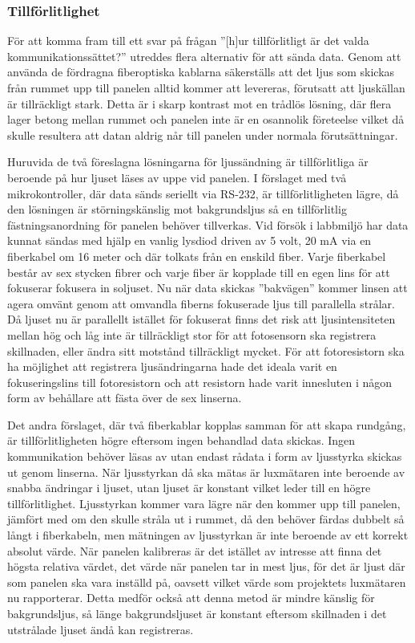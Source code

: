 
        \subsubsection{Tillförlitlighet} %
        \label{sub:tillf_rlitlighet}
            För att komma fram till ett svar på frågan ''[h]ur tillförlitligt är det valda kommunikationssättet?'' utreddes flera alternativ för att sända data. Genom att använda de fördragna fiberoptiska kablarna säkerställs att det ljus som skickas från rummet upp till panelen alltid kommer att levereras, förutsatt att ljuskällan är tillräckligt stark. Detta är i skarp kontrast mot en trådlös lösning, där flera lager betong mellan rummet och panelen inte är en osannolik företeelse vilket då skulle resultera att datan aldrig når till panelen under normala förutsättningar. \bigskip

            Huruvida de två föreslagna lösningarna för ljussändning är tillförlitliga är beroende på hur ljuset läses av uppe vid panelen. I förslaget med två mikrokontroller, där data sänds seriellt via RS-232, är tillförlitligheten lägre, då den lösningen är störningskänslig mot bakgrundsljus så en tillförlitlig fästningsanordning för panelen behöver tillverkas. Vid försök i labbmiljö har data kunnat sändas med hjälp en vanlig lysdiod driven av 5 volt, 20 mA via en fiberkabel om 16 meter och där tolkats från en enskild fiber. Varje fiberkabel består av sex stycken fibrer och varje fiber är kopplade till en egen lins för att fokuserar fokusera in soljuset. Nu när data skickas ''bakvägen'' kommer linsen att agera omvänt genom att omvandla fiberns fokuserade ljus till parallella strålar. Då ljuset nu är parallellt istället för fokuserat finns det risk att ljusintensiteten mellan hög och låg inte är tillräckligt stor för att fotosensorn ska registrera skillnaden, eller ändra sitt motstånd tillräckligt mycket. För att fotoresistorn ska ha möjlighet att registrera ljusändringarna hade det ideala varit en fokuseringslins till fotoresistorn och att resistorn hade varit innesluten i någon form av behållare att fästa över de sex linserna. \bigskip

            Det andra förslaget, där två fiberkablar kopplas samman för att skapa rundgång, är tillförlitligheten högre eftersom ingen behandlad data skickas. Ingen kommunikation behöver läsas av utan endast rådata i form av ljusstyrka skickas ut genom linserna. När ljusstyrkan då ska mätas är luxmätaren inte beroende av snabba ändringar i ljuset, utan ljuset är konstant vilket leder till en högre tillförlitlighet. Ljusstyrkan kommer vara lägre när den kommer upp till panelen, jämfört med om den skulle stråla ut i rummet, då den behöver färdas dubbelt så långt i fiberkabeln, men mätningen av ljusstyrkan är inte beroende av ett korrekt absolut värde. När panelen kalibreras är det istället av intresse att finna det högsta relativa värdet, det värde när panelen tar in mest ljus, för det är ljust där som panelen ska vara inställd på, oavsett vilket värde som projektets luxmätaren nu rapporterar. Detta medför också att denna metod är mindre känslig för bakgrundsljus, så länge bakgrundsljuset är konstant eftersom skillnaden i det utstrålade ljuset ändå kan registreras.\bigskip 


